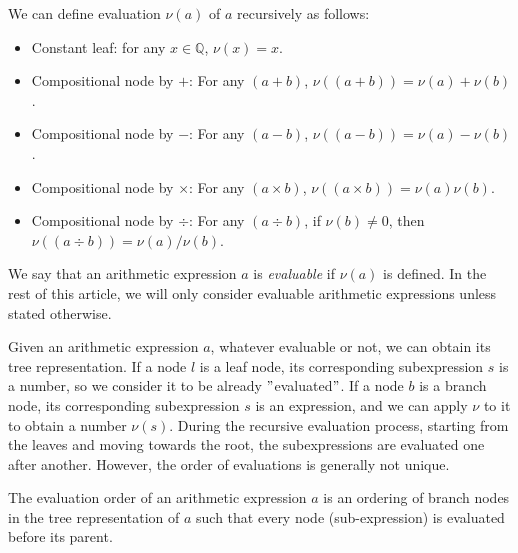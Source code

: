 We can define evaluation $\nu(a)$ of $a$ recursively as follows:
\begin{itemize}
  \item Constant leaf: for any $x \in \mathbb{Q}$, $\nu(x) = x$.
  \item Compositional node by $+$: For any $(a + b)$, $\nu((a + b)) = \nu(a) + \nu(b)$.
  \item Compositional node by $-$: For any $(a - b)$, $\nu((a - b)) = \nu(a) - \nu(b)$.
  \item Compositional node by $\times$: For any $(a \times b)$, $\nu((a \times b)) = \nu(a) \nu(b)$.
  \item Compositional node by $\div$: For any $(a \div b)$, if $\nu(b) \neq 0$, then $\nu((a \div b)) = \nu(a) / \nu(b)$.
\end{itemize}

We say that an arithmetic expression $a$ is \emph{evaluable} if $\nu(a)$ is defined.
In the rest of this article, we will only consider evaluable arithmetic expressions unless stated otherwise.

Given an arithmetic expression $a$, whatever evaluable or not, we can obtain its tree representation.
If a node $l$ is a leaf node, its corresponding subexpression $s$ is a number, so we consider it to be already \("\)evaluated\("\).
If a node $b$ is a branch node, its corresponding subexpression $s$ is an expression, and we can apply $\nu$ to it to obtain a number $\nu(s)$.
During the recursive evaluation process, starting from the leaves and moving towards the root, the subexpressions are evaluated one after another.
However, the order of evaluations is generally not unique.

\begin{definition}
The evaluation order of an arithmetic expression $a$ is an ordering of branch nodes in the tree representation of $a$
such that every node (sub-expression) is evaluated before its parent.
\end{definition}


